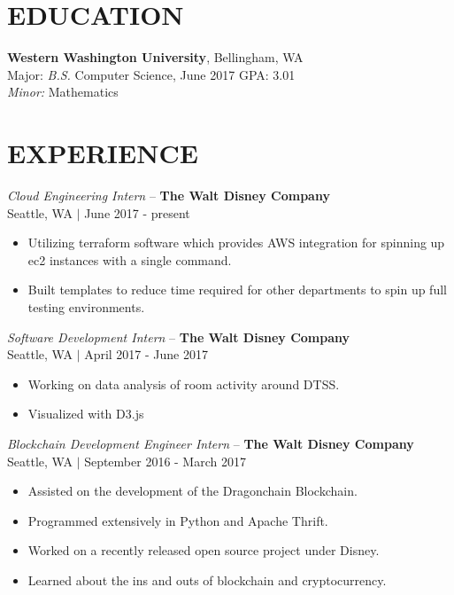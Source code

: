 \documentclass[line,margin]{res}
\begin{document}
\address{406.261.0065 $|$ alex@alex-benedetto.com $|$ github.com/wolfpack94}

\begin{resume}

\section{EDUCATION}
	{\bf Western Washington University}, Bellingham, WA \\
	Major: {\sl B.S.} Computer Science, {\small June 2017} GPA: 3.01\\
	{\sl Minor:} Mathematics
\section{EXPERIENCE}
	{\sl Cloud Engineering Intern} -- {\bf The Walt Disney Company}\\ 
	{\footnotesize Seattle, WA $|$ June 2017 - present}\\
	\begin{itemize} \itemsep -2pt
		\item Utilizing terraform software which provides AWS integration for spinning up ec2 instances with a single command.
		\item Built templates to reduce time required for other departments to spin up full testing environments.
	\end{itemize}
	{\sl Software Development Intern} -- {\bf The Walt Disney Company}\\ 
	{\footnotesize Seattle, WA $|$ April 2017 - June 2017}\\
	\begin{itemize} \itemsep -2pt
		\item Working on data analysis of room activity around DTSS.
		\item Visualized with D3.js
	\end{itemize}
	{\sl Blockchain Development Engineer Intern} -- {\bf The Walt Disney Company}\\ 
	{\footnotesize Seattle, WA $|$ September 2016 - March 2017}\\
	\begin{itemize} \itemsep -2pt
		\item Assisted on the development of the Dragonchain Blockchain.
		\item Programmed extensively in Python and Apache Thrift.
		\item Worked on a recently released open source project under Disney.
		\item Learned about the ins and outs of blockchain and cryptocurrency.

\end{itemize}
\end{resume}
\end{document}
